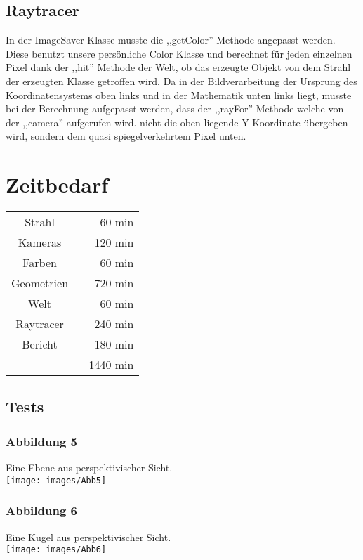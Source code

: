 \documentclass[14pt]{extarticle}
\begin{document}
\subsection{Raytracer}

In der ImageSaver Klasse musste die ,,getColor''-Methode angepasst werden. Diese benutzt unsere persönliche Color Klasse und berechnet für jeden einzelnen Pixel dank der ,,hit'' Methode der Welt, ob das erzeugte Objekt von dem Strahl der erzeugten Klasse getroffen wird. Da in der Bildverarbeitung der Ursprung des Koordinatensystems oben links und in der Mathematik unten links liegt, musste bei der Berechnung aufgepasst werden, dass der ,,rayFor'' Methode welche von der ,,camera'' aufgerufen wird. nicht die oben liegende Y-Koordinate übergeben wird, sondern dem quasi spiegelverkehrtem Pixel unten. 

\section{Zeitbedarf}
\begin{center}
\begin{tabular}{cr}
Strahl	  \	&60 min	\\
Kameras 	\	&120 min	\\
Farben \	&60 min	\\
Geometrien \	&720 min	\\
Welt \	&60 min	\\
Raytracer \	&240 min	\\
Bericht  \		&180 min	 \\
	\hline
	&1440 min
\end{tabular}
\end{center}

\subsection{Tests}
\subsubsection{Abbildung 5}
Eine Ebene aus perspektivischer Sicht.\\
\texttt{[image: images/Abb5]}\\

\subsubsection{Abbildung 6}
Eine Kugel aus perspektivischer Sicht.\\
\texttt{[image: images/Abb6]}\\
\end{document}
